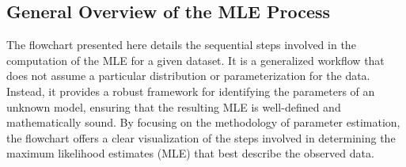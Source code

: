 \documentclass[
  12 pt,
  a4paper,
]{book}
\numberwithin{equation}{section}
\theoremstyle{plain}      %
\theoremstyle{definition} %
\theoremstyle{remark}     %
\theoremstyle{note}         %
\begin{document}
\hypertarget{general-overview-of-the-mle-process}{%
\subsection{General Overview of the MLE
Process}\label{general-overview-of-the-mle-process}}

The flowchart presented here details the sequential steps involved in
the computation of the MLE for a given dataset. It is a generalized
workflow that does not assume a particular distribution or
parameterization for the data. Instead, it provides a robust framework
for identifying the parameters of an unknown model, ensuring that the
resulting MLE is well-defined and mathematically sound. By focusing on
the methodology of parameter estimation, the flowchart offers a clear
visualization of the steps involved in determining the maximum
likelihood estimates (MLE) that best describe the observed data.
\end{document}
